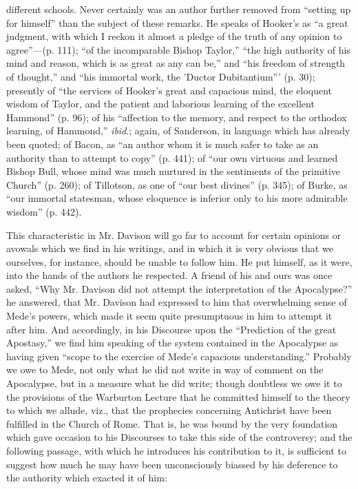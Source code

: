 different schools. Never certainly was an author further removed from ``setting
up for himself'' than the subject of these remarks. He speaks of Hooker's
as ``a great judgment, with which I reckon it almost a pledge of the
truth of any opinion to agree''—(p. 111); ``of the incomparable Bishop
Taylor,'' ``the high authority of his mind and reason, which is as great
as any can be,'' and ``his freedom of strength of thought,'' and ``his
immortal work, the 'Ductor Dubitantium''' (p. 30); presently of ``the
services of Hooker's great and capacious mind, the eloquent wisdom of
Taylor, and the patient and laborious learning of the excellent
Hammond'' (p. 96); of his ``affection to the memory, and respect to the
orthodox learning, of Hammond,'' \emph{ibid}.; again, of Sanderson, in
language which has already been quoted; of Bacon, as ``an author whom
it is much safer to take as an authority than to attempt to copy'' (p.
441); of ``our own virtuous and learned Bishop Bull, whose mind was
much nurtured in the sentiments of the primitive Church'' (p. 260); of
Tillotson, as one of ``our best divines'' (p. 345); of Burke, as ``our
immortal statesman, whose eloquence is inferior only to his more
admirable wisdom'' (p. 442).

This characteristic in Mr. Davison will go far to
account for certain opinions or avowals which we find in his writings,
and in which it is very obvious that we ourselves, for instance,
should be unable to follow him. He put himself, as it were, into the
hands of the authors he respected. A friend of his and ours was once
asked, ``Why Mr. Davison did not attempt the interpretation of the
Apocalypse?'' he answered, that Mr. Davison had expressed to him that
overwhelming sense of Mede's powers, which made it seem quite
presumptuous in him to attempt it after him. And accordingly, in his
Discourse upon the ``Prediction of the great Apostasy,'' we find him
speaking of the system contained in the Apocalypse as having given ``scope
to the exercise of Mede's capacious understanding.'' Probably we owe to
Mede, not only what he did not write in way of comment on the
Apocalypse, but in a measure what he did write; though doubtless we
owe it to the provisions of the Warburton Lecture that he committed
himself to the theory to which we allude, viz., that the prophecies
concerning Antichrist have been fulfilled in the Church of Rome. That
is, he was bound by the very foundation which gave occasion to his
Discourses to take this side of the controversy; and the following
passage, with which he introduces his contribution to it, is
sufficient to suggest how much he may have been unconsciously biassed
by his deference to the authority which exacted it of him:

